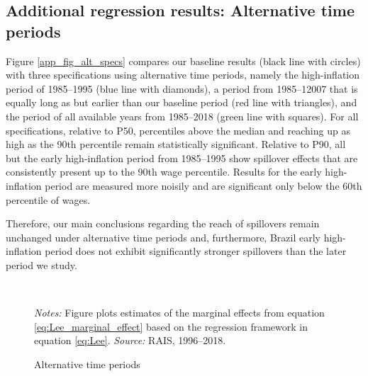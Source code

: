\clearpage
\subsection{Additional regression results: Alternative time periods\label{app_subsec_alt_periods}}

Figure \ref{app_fig_alt_specs} compares our baseline results (black line with circles) with three specifications using alternative time periods, namely the high-inflation period of 1985--1995 (blue line with diamonds), a period from 1985--12007 that is equally long as but earlier than our baseline period (red line with triangles), and the period of all available years from 1985--2018 (green line with squares). For all specifications, relative to P50, percentiles above the median and reaching up as high as the 90th percentile remain statistically significant. Relative to P90, all but the early high-inflation period from 1985--1995 show spillover effects that are consistently present up to the 90th wage percentile. Results for the early high-inflation period are measured more noisily and are significant only below the 60th percentile of wages.

Therefore, our main conclusions regarding the reach of spillovers remain unchanged under alternative time periods and, furthermore, Brazil early high-inflation period does not exhibit significantly stronger spillovers than the later period we study.

\begin{figure}[!htb]
  \centering
  \caption{\label{app_fig_alt_periods}Alternative time periods}
  \prefigvspace
  \hspace*{\fill}%
  \centerhfill[\qquad\qquad\qquad\qquad\qquad]
  \hspace*{\fill}
  \\
  \postfigvspace
  \begin{minipage}[t]{1\columnwidth}%
    \begin{spacing}{0.75}
      \emph{\scriptsize{}Notes:}{\scriptsize{} Figure plots estimates of the marginal effects from equation \eqref{eq:Lee_marginal_effect} based on the regression framework in equation \eqref{eq:Lee}. %
      \emph{\scriptsize{}Source: } RAIS, 1996--2018.}
    \end{spacing}
  \end{minipage}
\end{figure}




